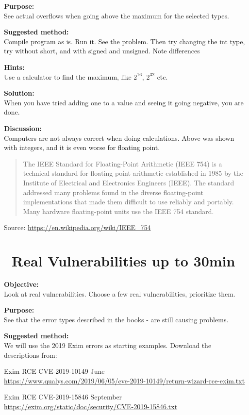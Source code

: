 \documentclass[a4paper,11pt,notitlepage]{report}
\begin{document}
{\bf Purpose:}\\
See actual overflows when going above the maximum for the selected types.


{\bf Suggested method:}\\
Compile program as is. Run it. See the problem. Then try changing the int type, try without short, and with signed and unsigned. Note differences

{\bf Hints:}\\
Use a calculator to find the maximum, like $2^{16}$, $2^{32}$ etc.

{\bf Solution:}\\
When you have tried adding one to a value and seeing it going negative, you are done.

{\bf Discussion:}\\
Computers are not always correct when doing calculations. Above was shown with integers, and it is even worse for floating point.

\begin{quote}\footnotesize
The IEEE Standard for Floating-Point Arithmetic (IEEE 754) is a technical standard for floating-point arithmetic established in 1985 by the Institute of Electrical and Electronics Engineers (IEEE). The standard addressed many problems found in the diverse floating-point implementations that made them difficult to use reliably and portably. Many hardware floating-point units use the IEEE 754 standard.
\end{quote}

Source: \url{https://en.wikipedia.org/wiki/IEEE_754}


\chapter{\faExclamationTriangle\ Real Vulnerabilities up to 30min}
\label{ex:real-vulns-exim}


{\bf Objective:}\\
Look at real vulnerabilities. Choose a few real vulnerabilities, prioritize them.

{\bf Purpose:}\\
See that the error types described in the books - are still causing problems.

{\bf Suggested method:}\\
We will use the 2019 Exim errors as starting examples. Download the descriptions from:
\begin{list2}
\item Exim RCE CVE-2019-10149 June\\ \url{https://www.qualys.com/2019/06/05/cve-2019-10149/return-wizard-rce-exim.txt}

\item Exim RCE CVE-2019-15846 September\\
\url{https://exim.org/static/doc/security/CVE-2019-15846.txt}
\end{list2}
\end{document}
